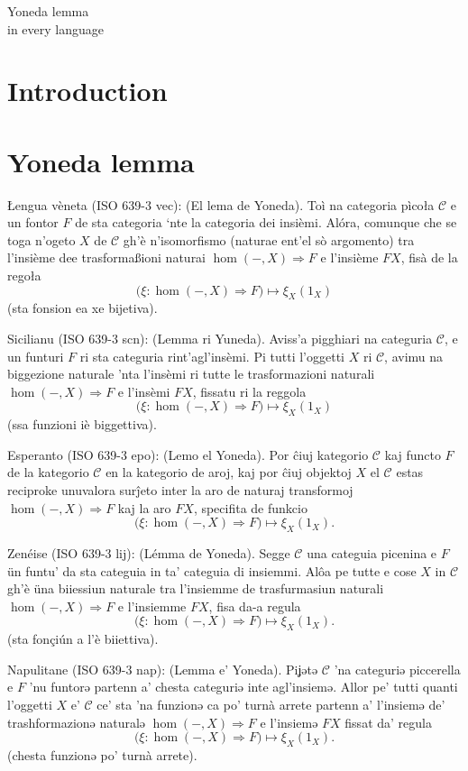 \documentclass{article}
\def\faire{\todo[inline]{TODO!}}
\newcommand{\tran}[3]{%
	\noindent\textsf{#1:} (#2). #3%
	\medskip\newline
}
\begin{document}
\begin{center}
Yoneda lemma \\
in every language
\end{center}
\section{Introduction}
\faire
\section{Yoneda lemma}
\faire

\tran{{\L}engua vèneta (ISO 639-3 vec)}{El lema de Yoneda}{
	Toì na categoria pìco{\l}a $\mathcal C$ e un fontor $F$ de sta categoria `nte la categoria dei insièmi. Al\'ora, comunque che se toga n'ogeto $X$ de $\mathcal C$ gh'è n'isomorfismo (naturae ent'el sò argomento) tra l'insième dee trasforma{\ss}ioni naturai $\hom(-,X)\Rightarrow F$ e l'insième $FX$, fisà de la rego{\l}a
	\[
	\Big(\xi : \hom(-,X)\Rightarrow F\Big) \mapsto \xi_X(1_X)
	\]
	(sta fonsion ea xe bijetiva).
}
\tran{Sicilianu (ISO 639-3 scn)}{Lemma ri Yuneda}{
	Aviss'a pigghiari na categuria $\mathcal C$, e un funturi $F$ ri sta categuria rint'agl'insèmi. Pi tutti l'oggetti $X$ ri $\mathcal C$, avimu na biggezione naturale 'nta l'insèmi ri tutte le trasformazioni naturali $\hom(-,X)\Rightarrow F$ e l'insèmi $FX$, fissatu ri la reggola
	\[
		\Big(\xi : \hom(-,X)\Rightarrow F\Big) \mapsto \xi_X(1_X)
	\]
	(ssa funzioni iè biggettiva).
}
\tran{Esperanto (ISO 639-3 epo)}{Lemo el Yoneda}{
	Por \^{c}iuj kategorio $\mathcal C$ kaj functo $F$ de la kategorio $\mathcal C$ en la kategorio de aroj, kaj por \^{c}iuj objektoj $X$ el $\mathcal C$ estas reciproke unuvalora sur\^{j}eto inter la aro de naturaj transformoj $\hom(-,X)\Rightarrow F$ kaj la aro $FX$, specifita de funkcio
	\[
		\Big(\xi : \hom(-,X)\Rightarrow F\Big) \mapsto \xi_X(1_X).
	\]
}
\tran{Zenéise (ISO 639-3 lij)}{Lémma de Yoneda}{
	Segge $\mathcal C$ una categuia picenina e $F$ ün funtu' da sta categuia in ta' categuia di insiemmi. Al\^{o}a pe tutte e cose $X$ in $\mathcal C$ gh'è üna biiessiun naturale tra l'insiemme de trasfurmasiun naturali $\hom(-,X)\Rightarrow F$ e l'insiemme $FX$, fisa da-a regula
    \[
		\Big(\xi : \hom(-,X)\Rightarrow F\Big) \mapsto \xi_X(1_X).
	\]
    (sta fonçiún a l'è biiettiva).
}
\tran{Napulitane (ISO 639-3 nap)}{Lemma e' Yoneda}{
	Piʝətə $\mathcal C$ 'na categuriə piccerella e $F$ 'nu funtorə partenn a' chesta categuriə inte agl'insiemə. Allor pe' tutti quanti l'oggetti $X$ e' $\mathcal C$ ce' sta 'na funzionə ca po' turnà arrete partenn a' l'insiemə de' trashformazionə naturalə $\hom(-,X)\Rightarrow F$ e l'insiemə $FX$ fissat da' regula
	\[
		\Big(\xi : \hom(-,X)\Rightarrow F\Big) \mapsto \xi_X(1_X).
	\]
  (chesta funzionə po' turnà arrete).
}
\end{document}
